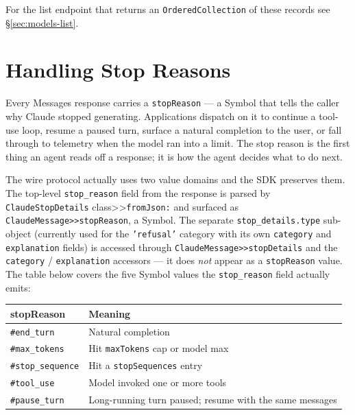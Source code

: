 \documentclass[a4paper,10pt,fleqn]{article}
\begin{document}
For the list endpoint that returns an
\texttt{OrderedCollection} of these records see
\S\ref{sec:models-list}.

\medskip
{}

\section{Handling Stop Reasons}
\label{sec:stop-reasons}

Every Messages response carries a \texttt{stopReason} --- a Symbol
that tells the caller why Claude stopped generating.  Applications
dispatch on it to continue a tool-use loop, resume a paused turn,
surface a natural completion to the user, or fall through to
telemetry when the model ran into a limit.  The stop reason is the
first thing an agent reads off a response; it is how the agent
decides what to do next.

\begin{sloppypar}
The wire protocol actually uses two value domains and the SDK
preserves them.  The top-level \texttt{stop\_reason} field from the
response is parsed by \texttt{ClaudeStopDetails} class>>\texttt{fromJson:}
and surfaced as \texttt{ClaudeMessage>>stopReason}, a Symbol.  The
separate \texttt{stop\_details.type} sub-object (currently used for
the \texttt{'refusal'} category with its own \texttt{category} and
\texttt{explanation} fields) is accessed through
\texttt{ClaudeMessage>>stopDetails} and the \texttt{category} /
\texttt{explanation} accessors --- it does \emph{not} appear as a
\texttt{stopReason} value.  The table below covers the five
Symbol values the \texttt{stop\_reason} field actually emits:
\end{sloppypar}

\begin{center}
\begin{tabular}{@{}lp{9.5cm}@{}}
\toprule
\textbf{stopReason} & \textbf{Meaning} \\
\midrule
\texttt{\#end\_turn}     & Natural completion \\
\texttt{\#max\_tokens}   & Hit \texttt{maxTokens} cap or model max \\
\texttt{\#stop\_sequence} & Hit a \texttt{stopSequences} entry \\
\texttt{\#tool\_use}     & Model invoked one or more tools \\
\texttt{\#pause\_turn}   & Long-running turn paused; resume with the same messages \\
\bottomrule
\end{tabular}
\end{center}
\end{document}
